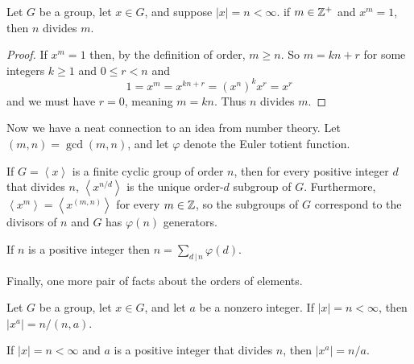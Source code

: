 \documentclass[../m171main.tex]{subfiles}
\begin{document}
\begin{theorem}[]
    Let $G$ be a group, let $x \in G$, and suppose $|x| = n < \infty$.
    if $m \in \mathbb{Z}^+$ and $x^{m} = 1$, then $n$ divides $m$.
\end{theorem}

\begin{proof}
    If $x^{m} = 1$ then, by the definition of order, $m \geq n$.
    So $m = kn + r$ for some integers $k \geq 1$ and $0 \leq r < n$ and \vspace{-6pt}
    \[ 1 = x^{m} = x^{kn + r} = \left( x^{n} \right)^{k} x^{r} = x^{r} \]
    and we must have $r = 0$, meaning $m = kn$.
    Thus $n$ divides $m$.
\end{proof}

Now we have a neat connection to an idea from number theory.
Let $(m,n) = \gcd(m,n)$, and let $\varphi$ denote the Euler totient function.

\begin{theorem}[]
    If $G = \left< x \right>$ is a finite cyclic group of order $n$, then for every positive integer $d$ that divides $n$, $\left< x^{n / d} \right>$ is the unique order-$d$ subgroup of $G$.
    Furthermore, $\left< x^{m} \right> = \left< x^{(m,n)} \right>$ for every $m \in \mathbb{Z}$, so the subgroups of $G$ correspond to the divisors of $n$ and $G$ has $\varphi(n)$ generators.
\end{theorem}

\begin{corollary}[]
    If $n$ is a positive integer then $n = \sum_{d \,|\, n} \varphi(d)$.
\end{corollary}

Finally, one more pair of facts about the orders of elements.

\begin{theorem}[]
    Let $G$ be a group, let $x \in G$, and let $a$ be a nonzero integer.
    If $|x| = n < \infty$, then $|x^{a}| = n / (n,a)$.
\end{theorem}

\begin{corollary}[]
    If $|x| = n < \infty$ and $a$ is a positive integer that divides $n$, then $|x^{a}| = n / a$.
\end{corollary}
\end{document}
